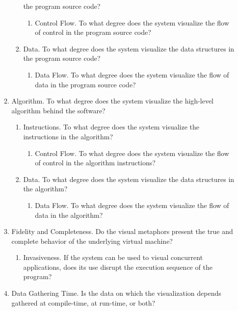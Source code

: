 \begin{enumerate}
\begin{enumerate}
\begin{enumerate}
      the program source code?
      \begin{enumerate}
        \item Control Flow. To what degree does the system visualize the flow of
        control in the program source code?
      \end{enumerate}
      \item Data. To what degree does the system visualize the data structures
      in the program source code?
      \begin{enumerate}
        \item Data Flow. To what degree does the system visualize the flow of
        data in the program source code?
      \end{enumerate}
    \end{enumerate}
    \item Algorithm. To what degree does the system visualize the high-level
    algorithm behind the software?
    \begin{enumerate}
      \item Instructions. To what degree does the system visualize the
      instructions in the algorithm?
      \begin{enumerate}
        \item Control Flow. To what degree does the system visualize the flow of
        control in the algorithm instructions?
      \end{enumerate}
      \item Data. To what degree does the system visualize the data structures
      in the algorithm?
      \begin{enumerate}
        \item Data Flow. To what degree does the system visualize the flow of
        data in the algorithm?
      \end{enumerate}
    \end{enumerate}
    \item Fidelity and Completeness. Do the visual metaphors present the true
    and complete behavior of the underlying virtual machine?
    \begin{enumerate}
      \item Invasiveness. If the system can be used to visual concurrent
      applications, does its use disrupt the execution sequence of the program?
    \end{enumerate}
    \item Data Gathering Time. Is the data on which the visualization depends
    gathered at compile-time, at run-time, or both?

\end{enumerate}
\end{enumerate}
